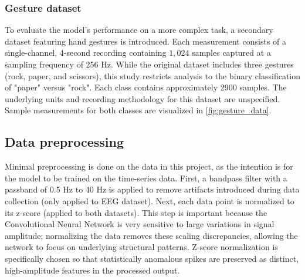 \subsubsection{Gesture dataset}
To evaluate the model's performance on a more complex task, a secondary dataset featuring hand gestures is introduced. Each measurement consists of a single-channel, 4-second recording containing $1,024$ samples captured at a sampling frequency of $256$ Hz. While the original dataset includes three gestures (rock, paper, and scissors), this study restricts analysis to the binary classification of "paper" versus "rock". Each class contains approximately 2900 samples. The underlying units and recording methodology for this dataset are unspecified. Sample measurements for both classes are visualized in \cref{fig:gesture_data}.

\subsection{Data preprocessing}
Minimal preprocessing is done on the data in this project, as the intention is for the model to be trained on the time-series data. First, a bandpass filter with a passband of 0.5 Hz to 40 Hz is applied to remove artifacts introduced during data collection (only applied to EEG dataset). Next, each data point is normalized to its z-score (applied to both datasets). This step is important because the Convolutional Neural Network is very sensitive to large variations in signal amplitude; normalizing the data removes these scaling discrepancies, allowing the network to focus on underlying structural patterns. Z-score normalization is specifically chosen so that statistically anomalous spikes are preserved as distinct, high-amplitude features in the processed output.

